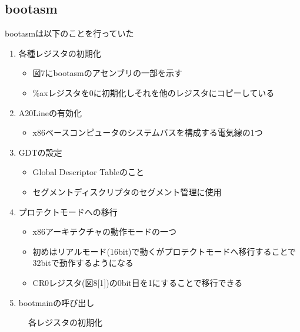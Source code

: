 \documentclass[submit,techreq,noauthor]{eco}	%
\begin{document}
\subsection{bootasm}
 bootasmは以下のことを行っていた
 
\begin{enumerate}
\renewcommand{\labelenumi}{\arabic{enumi}).}
\item 各種レジスタの初期化
  \begin{itemize}
    \item 図7にbootasmのアセンブリの一部を示す
    \item \%axレジスタを0に初期化しそれを他のレジスタにコピーしている
  \end{itemize}
\item A20Lineの有効化
   \begin{itemize}
    \item x86ベースコンピュータのシステムバスを構成する電気線の1つ
  \end{itemize}
\item GDTの設定
   \begin{itemize}
    \item Global Descriptor Tableのこと
    \item セグメントディスクリプタのセグメント管理に使用
  \end{itemize}
\item プロテクトモードへの移行
   \begin{itemize}
    \item x86アーキテクチャの動作モードの一つ
    \item 初めはリアルモード(16bit)で動くがプロテクトモードへ移行することで32bitで動作するようになる
    \item CR0レジスタ(図8[1])の0bit目を1にすることで移行できる
  \end{itemize}
\item bootmainの呼び出し
\end{enumerate}

\begin{figure}[H]
    \centering
    \caption{各レジスタの初期化}
    \label{sample}
\end{figure}
\end{document}
